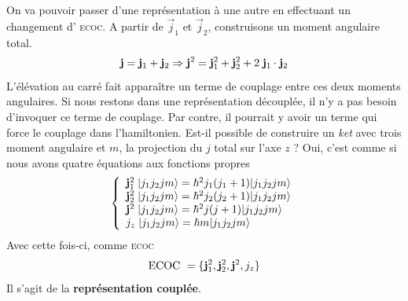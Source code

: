 On va pouvoir passer d'une représentation à une autre en effectuant un changement d'
\textsc{ecoc}. A partir de $\vec j_1$ et $\vec j_2$, construisons un moment angulaire
total.
\begin{equation}
{\bf j} = {\bf j}_1 + {\bf j}_2 \Rightarrow 
{\bf j}^2 = {\bf j}_1^2 + {\bf j}_2^2 + 2 \; {\bf j}_1  \cdot {\bf j}_2
\end{equation}
L'élévation au carré fait apparaître un terme de couplage entre ces deux moments angulaires. Si
nous restons dans une représentation découplée, il n'y a pas besoin d'invoquer ce terme de 
couplage. Par contre, il pourrait y avoir un terme qui force le couplage dans l'hamiltonien. Est-il
possible de construire un \textit{ket} avec trois moment angulaire et $m$, la projection du $j$ 
total sur l'axe $z$ ? Oui, c'est comme si nous avons quatre équations aux fonctions propres
\begin{equation}
\left\{ \begin{array}{l}
{\bf j}_1^2 \; \vert j_1 j_2 j m \rangle  =  \hbar^2 j_1(j_1 + 1) \vert j_1 j_2 j m \rangle \\
{\bf j}_2^2 \; \vert j_1 j_2 j m \rangle  =  \hbar^2 j_2(j_2 + 1) \vert j_1 j_2 j m \rangle \\
{\bf j}^2 \;  \vert j_1 j_2 j m \rangle  =  \hbar^2 j(j + 1)  \vert j_1 j_2 j m \rangle   \\
j_z \;  \vert j_1 j_2 j m \rangle  =  \hbar m  \vert j_1 j_2 j m \rangle   \\
 \end{array} \right.
\end{equation}
Avec cette fois-ci, comme \textsc{ecoc}
\begin{equation}
\mbox{ECOC}~ = \{ {\bf j}_1^2,  {\bf j}_2^2, {\bf j}^2, j_z \}
\end{equation}
Il s'agit de la \textbf{représentation couplée}.\\

